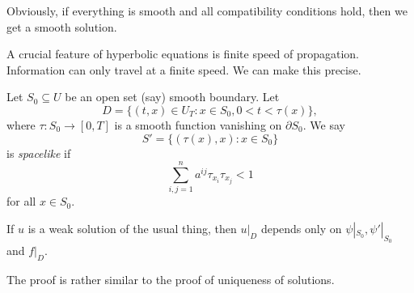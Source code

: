 \documentclass[a4paper]{article}
\begin{document}
Obviously, if everything is smooth and all compatibility conditions hold, then we get a smooth solution.

A crucial feature of hyperbolic equations is finite speed of propagation. Information can only travel at a finite speed. We can make this precise.

Let $S_0 \subseteq U$ be an open set (say) smooth boundary. Let
\[
  D = \{(t, x) \in U_T : x \in S_0, 0 < t < \tau(x)\},
\]
where $\tau: S_0 \to [0, T]$ is a smooth function vanishing on $\partial S_0$. We say
\[
  S' = \{(\tau(x), x): x \in S_0\}
\]
is \emph{spacelike} if
\[
  \sum_{i, j = 1}^n a^{ij} \tau_{x_i} \tau_{x_j} < 1
\]
for all $x \in S_0$.

\begin{thm}
  If $u$ is a weak solution of the usual thing, then $u|_D$ depends only on $\psi|_{S_0}, \psi'|_{S_0}$ and $f|_{D}$.
\end{thm}
The proof is rather similar to the proof of uniqueness of solutions.
\end{document}
